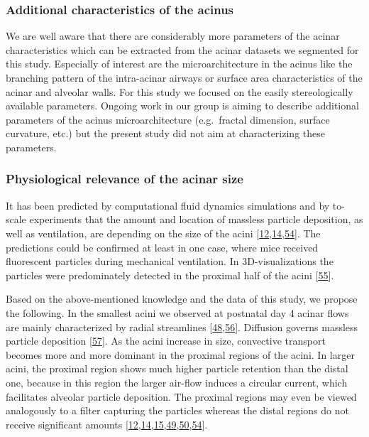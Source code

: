 \documentclass[
  american,
]{article}
\begin{document}
\hypertarget{additional-characteristics-of-the-acinus}{%
\subsubsection{Additional characteristics of the acinus}\label{additional-characteristics-of-the-acinus}}

We are well aware that there are considerably more parameters of the acinar characteristics which can be extracted from the acinar datasets we segmented for this study.
Especially of interest are the microarchitecture in the acinus like the branching pattern of the intra-acinar airways or surface area characteristics of the acinar and alveolar walls.
For this study we focused on the easily stereologically available parameters.
Ongoing work in our group is aiming to describe additional parameters of the acinus microarchitecture (e.g.~fractal dimension, surface curvature, etc.) but the present study did not aim at characterizing these parameters.

\hypertarget{physiological-relevance-of-the-acinar-size}{%
\subsubsection{Physiological relevance of the acinar size}\label{physiological-relevance-of-the-acinar-size}}

It has been predicted by computational fluid dynamics simulations and by to-scale experiments that the amount and location of massless particle deposition, as well as ventilation, are depending on the size of the acini {[}\protect\hyperlink{ref-CVl41LwO}{12},\protect\hyperlink{ref-1DP2FRUSZ}{14},\protect\hyperlink{ref-RJ9GQcwl}{54}{]}.
The predictions could be confirmed at least in one case, where mice received fluorescent particles during mechanical ventilation.
In 3D-visualizations the particles were predominately detected in the proximal half of the acini {[}\protect\hyperlink{ref-19jBv0ima}{55}{]}.

Based on the above-mentioned knowledge and the data of this study, we propose the following.
In the smallest acini we observed at postnatal day 4 acinar flows are mainly characterized by radial streamlines {[}\protect\hyperlink{ref-eioib1TQ}{48},\protect\hyperlink{ref-afF83siN}{56}{]}.
Diffusion governs massless particle deposition {[}\protect\hyperlink{ref-k5fqLjiy}{57}{]}.
As the acini increase in size, convective transport becomes more and more dominant in the proximal regions of the acini.
In larger acini, the proximal region shows much higher particle retention than the distal one, because in this region the larger air-flow induces a circular current, which facilitates alveolar particle deposition.
The proximal regions may even be viewed analogously to a filter capturing the particles whereas the distal regions do not receive significant amounts {[}\protect\hyperlink{ref-CVl41LwO}{12},\protect\hyperlink{ref-1DP2FRUSZ}{14},\protect\hyperlink{ref-yHHhvOtP}{15},\protect\hyperlink{ref-1HOyVjqpM}{49},\protect\hyperlink{ref-OT4s1CSX}{50},\protect\hyperlink{ref-RJ9GQcwl}{54}{]}.
\end{document}
